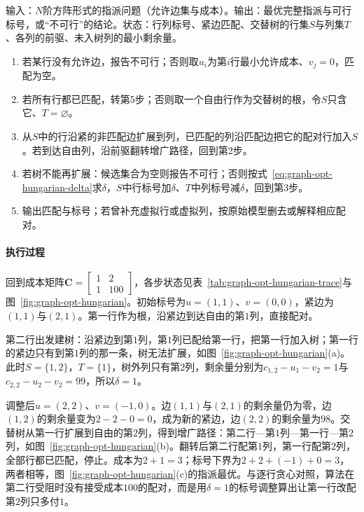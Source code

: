\begin{algorithm}[匈牙利算法]
\label{alg:graph-opt-hungarian}
输入：$N$阶方阵形式的指派问题（允许边集与成本）。输出：最优完整指派与可行标号，或“不可行”的结论。状态：行列标号、紧边匹配、交替树的行集$S$与列集$T$、各列的前驱、未入树列的最小剩余量。
\begin{enumerate}
  \item 若某行没有允许边，报告不可行；否则取$u_i$为第$i$行最小允许成本、$v_j=0$，匹配为空。
  \item 若所有行都已匹配，转第5步；否则取一个自由行作为交替树的根，令$S$只含它、$T=\varnothing$。
  \item 从$S$中的行沿紧的非匹配边扩展到列，已匹配的列沿匹配边把它的配对行加入$S$。若到达自由列，沿前驱翻转增广路径，回到第2步。
  \item 若树不能再扩展：候选集合为空则报告不可行；否则按式~\eqref{eq:graph-opt-hungarian-delta}求$\delta$，$S$中行标号加$\delta$、$T$中列标号减$\delta$，回到第3步。
  \item 输出匹配与标号；若曾补充虚拟行或虚拟列，按原始模型删去或解释相应配对。
\end{enumerate}
\end{algorithm}

\paragraph{执行过程}
回到成本矩阵$\bm C=\left[\begin{smallmatrix}1&2\\1&100\end{smallmatrix}\right]$，各步状态见表~\ref{tab:graph-opt-hungarian-trace}与图~\ref{fig:graph-opt-hungarian}。初始标号为$u=(1,1)$、$v=(0,0)$，紧边为$(1,1)$与$(2,1)$。第一行作为根，沿紧边到达自由的第$1$列，直接配对。

第二行出发建树：沿紧边到第$1$列，第$1$列已配给第一行，把第一行加入树；第一行的紧边只有到第$1$列的那一条，树无法扩展，如图~\ref{fig:graph-opt-hungarian}(a)。此时$S=\{1,2\}$，$T=\{1\}$，树外列只有第$2$列，剩余量分别为$c_{1,2}-u_1-v_2=1$与$c_{2,2}-u_2-v_2=99$，所以$\delta=1$。

调整后$u=(2,2)$、$v=(-1,0)$。边$(1,1)$与$(2,1)$的剩余量仍为零，边$(1,2)$的剩余量变为$2-2-0=0$，成为新的紧边，边$(2,2)$的剩余量为$98$。交替树从第一行扩展到自由的第$2$列，得到增广路径：第二行—第$1$列—第一行—第$2$列，如图~\ref{fig:graph-opt-hungarian}(b)。翻转后第二行配第$1$列，第一行配第$2$列，全部行都已匹配，停止。成本为$2+1=3$；标号下界为$2+2+(-1)+0=3$，两者相等，图~\ref{fig:graph-opt-hungarian}(c)的指派最优。与逐行贪心对照，算法在第二行受阻时没有接受成本$100$的配对，而是用$\delta=1$的标号调整算出让第一行改配第$2$列只多付$1$。


